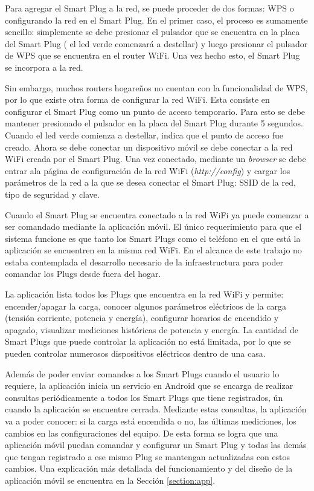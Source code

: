 Para agregar el Smart Plug a la red, se puede proceder de dos formas: WPS o configurando la red en el Smart Plug. En el primer caso, el proceso es sumamente sencillo: simplemente se debe presionar el pulsador que se encuentra en la placa del Smart Plug ( el led verde comenzará a destellar) y luego presionar el pulsador de WPS que se encuentra en el router WiFi. Una vez hecho esto, el Smart Plug se incorpora a la red. 

Sin embargo, muchos routers hogareños no cuentan con la funcionalidad de WPS, por lo que existe otra forma de configurar la red WiFi. Esta consiste en configurar el Smart Plug como un punto de acceso temporario. Para esto se debe mantener presionado el pulsador en la placa del Smart Plug durante 5 segundos. Cuando el led verde comienza a destellar, indica que el punto de acceso fue creado. Ahora se debe conectar un dispositivo móvil se debe conectar a la red WiFi creada por el Smart Plug. Una vez conectado, mediante un \textit{browser} se debe entrar ala página de configuración de la red WiFi (\textit{http://config}) y cargar los parámetros de la red a la que se desea conectar el Smart Plug: SSID de la red, tipo de seguridad y clave.

Cuando el Smart Plug se encuentra conectado a la red WiFi ya puede comenzar a ser comandado mediante la aplicación móvil. El único requerimiento para que el sistema funcione es que tanto los Smart Plugs como el teléfono en el que está la aplicación se encuentren en la misma red WiFi. En el alcance de este trabajo no estaba contemplada el desarrollo necesario de la infraestructura para poder comandar los Plugs desde fuera del hogar.

La aplicación lista todos los Plugs que encuentra en la red WiFi y permite: encender/apagar la carga, conocer algunos parámetros eléctricos de la carga (tensión corriente, potencia y energía), configurar horarios de encendido y apagado, visualizar mediciones históricas de potencia y energía. La cantidad de Smart Plugs que puede controlar la aplicación no está limitada, por lo que se pueden controlar numerosos dispositivos eléctricos dentro de una casa.

Además de poder enviar comandos a los Smart Plugs cuando el usuario lo requiere, la aplicación inicia un servicio en Android que se encarga de realizar consultas periódicamente a todos los Smart Plugs que tiene registrados, ún cuando la aplicación se encuentre cerrada. Mediante estas consultas, la aplicación va a poder conocer: si la carga está encendida o no, las últimas mediciones, los cambios en las configuraciones del equipo. De esta forma se logra que una aplicación móvil puedan comandar y configurar un Smart Plug y todas las demás que tengan registrado a ese mismo Plug se mantengan actualizadas con estos cambios. Una explicación más detallada del funcionamiento y del diseño de la aplicación móvil se encuentra en la Sección \ref{section:app}.

